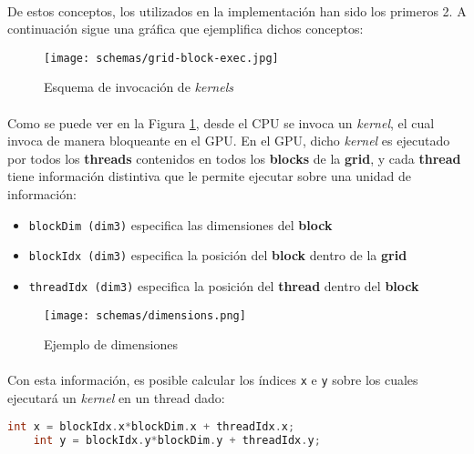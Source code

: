 \documentclass[12pt, twocolumn]{article}
\begin{document}
    \paragraph{} De estos conceptos, los utilizados en la implementación han sido los primeros 2. A continuación sigue una gráfica que ejemplifica dichos conceptos:
    
    \begin{figure}[H]
		\centering
		\texttt{[image: schemas/grid-block-exec.jpg]}
		\caption{Esquema de invocación de \textit{kernels}}
		\label{gridblockexec}
	\end{figure}
	
	\paragraph{} Como se puede ver en la Figura \ref{gridblockexec}, desde el CPU se invoca un \textit{kernel}, el cual invoca de manera bloqueante en el GPU. En el GPU, dicho \textit{kernel} es ejecutado por todos los \textbf{threads} contenidos en todos los \textbf{blocks} de la \textbf{grid}, y cada \textbf{thread} tiene información distintiva que le permite ejecutar sobre una unidad de información:
	
	\begin{itemize}
	    \item \verb|blockDim (dim3)| especifica las dimensiones del \textbf{block}
	    \item \verb|blockIdx (dim3)| especifica la posición del \textbf{block} dentro de la \textbf{grid}
	    \item \verb|threadIdx (dim3)| especifica la posición del \textbf{thread} dentro del \textbf{block}
	\end{itemize}
	
    \begin{figure}[H]
		\centering
		\texttt{[image: schemas/dimensions.png]}
		\caption{Ejemplo de dimensiones}
		\label{dimensionsexample}
	\end{figure}
	
	\paragraph{} Con esta información, es posible calcular los índices \verb|x| e \verb|y| sobre los cuales ejecutará un \textit{kernel} en un thread dado:
	
	\begin{lstlisting}[linewidth=\columnwidth,breaklines=true,language=C++]
	int x = blockIdx.x*blockDim.x + threadIdx.x;
	int y = blockIdx.y*blockDim.y + threadIdx.y;
    \end{lstlisting}
    
\end{document}
